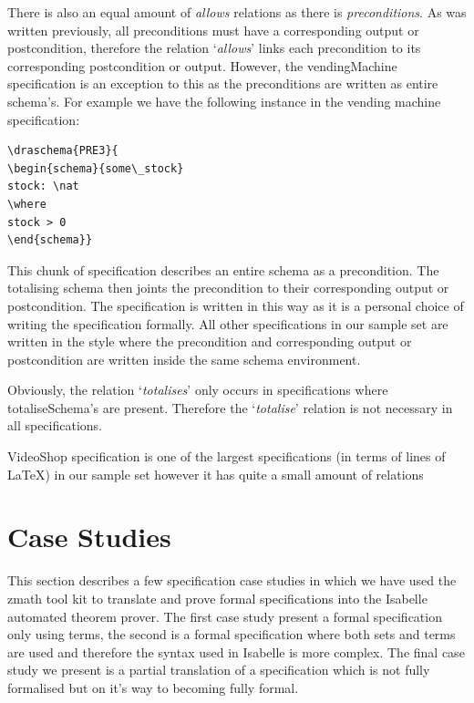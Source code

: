 There is also an equal amount of \emph{allows} relations as there is \emph{preconditions}. As was written previously, all preconditions must have a corresponding output or postcondition, therefore the relation `\emph{allows}' links each precondition to its corresponding postcondition or output. However, the vendingMachine specification is an exception to this as the preconditions are written as entire schema's. For example we have the following instance in the vending machine specification:

\begin{verbatim}
\draschema{PRE3}{
\begin{schema}{some\_stock}
stock: \nat
\where
stock > 0
\end{schema}}
\end{verbatim}

This chunk of specification describes an entire schema as a precondition. The totalising schema then joints the precondition to their corresponding output or postcondition. The specification is written in this way as it is a personal choice of writing the specification formally. All other specifications in our sample set are written in the style where the precondition and corresponding output or postcondition are written inside the same schema environment.

Obviously, the relation `\emph{totalises}' only occurs in specifications where totaliseSchema's are present. Therefore the `\emph{totalise}' relation is not necessary in all specifications.

VideoShop specification is one of the largest specifications (in terms of lines of \LaTeX{}) in our sample set however it has quite a small amount of relations




\section{Case Studies}

This section describes a few specification case studies in which we have used the \gls{zmath} tool kit to translate and prove formal specifications into the Isabelle automated theorem prover. The first case study present a formal specification only using terms, the second is a formal specification where both sets and terms are used and therefore the syntax used in Isabelle is more complex. The final case study we present is a partial translation of a specification which is not fully formalised but on it's way to becoming fully formal.

